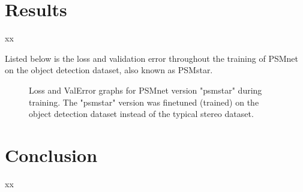 \section{Results}
xx


Listed below is the loss and validation error throughout the training of PSMnet on the object detection dataset, also known as PSMstar.



\begin{figure}[H]
    \centering
    \caption{Loss and ValError graphs for PSMnet version "psmstar" during training. The "psmstar" version was finetuned (trained) on the object detection dataset instead of the typical stereo dataset.}
    \label{psmnet_star_train_info}
\end{figure}







\section{Conclusion}
xx